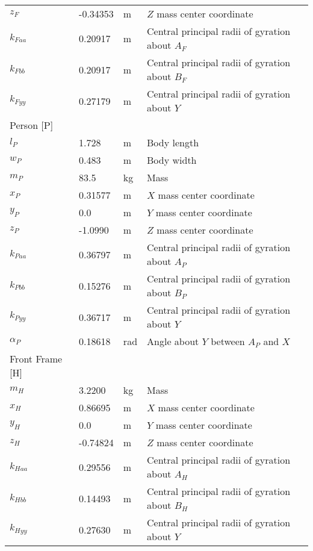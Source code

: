 \documentclass{bmd2019a}
\begin{document}
\begin{table}
\begin{tabular}{llll}
    $z_F$     & -0.34353 & \si{\meter} & $Z$ mass center coordinate \\
    $k_{Faa}$ &  0.20917 & \si{\meter} & Central principal radii of gyration about $A_F$ \\
    $k_{Fbb}$ &  0.20917 & \si{\meter} & Central principal radii of gyration about $B_F$ \\
    $k_{Fyy}$ &  0.27179 & \si{\meter} & Central principal radii of gyration about $Y$ \\
    Person [P] & & \\
    \midrule
    $l_P$      &  1.728   & \si{\meter} & Body length \\
    $w_P$      &  0.483   & \si{\meter} & Body width \\
    $m_P$      &  83.5    & \si{\kilogram} & Mass \\
    $x_P$      &  0.31577 & \si{\meter} & $X$ mass center coordinate \\
    $y_P$      & 0.0      & \si{\meter} & $Y$ mass center coordinate \\
    $z_P$      & -1.0990  & \si{\meter} & $Z$ mass center coordinate \\
    $k_{Paa}$  &  0.36797 & \si{\meter} & Central principal radii of gyration about $A_P$ \\
    $k_{Pbb}$  &  0.15276 & \si{\meter} & Central principal radii of gyration about $B_P$ \\
    $k_{Pyy}$  &  0.36717 & \si{\meter} & Central principal radii of gyration about $Y$ \\
    $\alpha_P$ & 0.18618 & \si{\radian} & Angle about $Y$ between $A_P$ and $X$ \\
    Front Frame [H] & & \\
    \midrule
    $m_H$ & 3.2200 & \si{\kilogram}     & Mass \\
    $x_H$ & 0.86695 & \si{\meter}       & $X$ mass center coordinate \\
    $y_H$ & 0.0 & \si{\meter}           & $Y$ mass center coordinate \\
    $z_H$ & -0.74824 & \si{\meter}      & $Z$ mass center coordinate \\
    $k_{Haa}$ & 0.29556 & \si{\meter}   & Central principal radii of gyration about $A_H$ \\
    $k_{Hbb}$ & 0.14493 & \si{\meter}   & Central principal radii of gyration about $B_H$ \\
    $k_{Hyy}$ & 0.27630 & \si{\meter}   & Central principal radii of gyration about $Y$ \\

\end{tabular}
\end{table}
\end{document}

